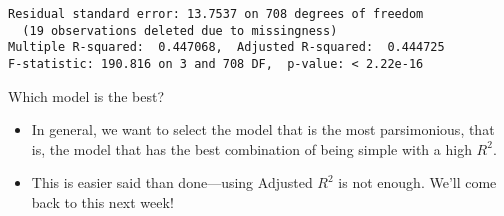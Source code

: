 \documentclass{beamer}\usepackage[]{graphicx}\usepackage[]{color}
\makeatletter
\newenvironment{kframe}{%
 \def\at@end@of@kframe{}%
 \ifinner\ifhmode%
  \def\at@end@of@kframe{\end{minipage}}%
  \begin{minipage}{\columnwidth}%
 \fi\fi%
 \def\FrameCommand##1{\hskip\@totalleftmargin \hskip-\fboxsep
 \colorbox{shadecolor}{##1}\hskip-\fboxsep
     \hskip-\linewidth \hskip-\@totalleftmargin \hskip\columnwidth}%
 \MakeFramed {\advance\hsize-\width
   \@totalleftmargin\z@ \linewidth\hsize
   \@setminipage}}%
 {\par\unskip\endMakeFramed%
 \at@end@of@kframe}
\newenvironment{knitrout}{}{} %
\makeatother
\begin{document}
\begin{darkframes}
\begin{frame}[fragile]
\begin{knitrout}
\begin{kframe}
\begin{verbatim}
Residual standard error: 13.7537 on 708 degrees of freedom
  (19 observations deleted due to missingness)
Multiple R-squared:  0.447068,	Adjusted R-squared:  0.444725 
F-statistic: 190.816 on 3 and 708 DF,  p-value: < 2.22e-16
\end{verbatim}
\end{kframe}
\end{knitrout}
    \end{frame}

    \begin{frame}{Which model is the best?}
      \begin{itemize}[<+->]
        \item In general, we want to select the model that is the most \alert{parsimonious}, that is, the model that has the best combination of being simple with a high $R^2$.
        \item This is easier said than done---using Adjusted $R^2$ is not enough. We'll come back to this next week!
      \end{itemize}
    \end{frame}
  \end{darkframes}
\end{document}
